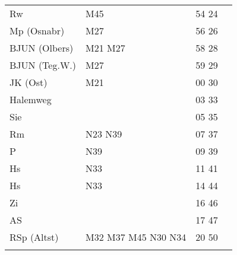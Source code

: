\begin{tabular}{!{\color{schiefergrau}\vrule width 3pt}*{4}{l!{\color{schiefergrau}\vrule width 3pt}}}
Rw           & \mbus{} M45                                 & 54 24 &             \\
Mp (Osnabr)  & \mbus{} M27                                 & 56 26 &             \\
BJUN (Olbers)& \mbus{} M21 M27                             & 58 28 &             \\
BJUN (Teg.W.)& \mbus{} M27                                 & 59 29 &             \\
JK (Ost)     & \mbus{} M21                                 & 00 30 &             \\
Halemweg     &                                             & 03 33 &             \\
Sie          &                                             & 05 35 &             \\
Rm           & \nbus{} N23 N39                             & 07 37 &             \\
P            & \nbus{} N39                                 & 09 39 &             \\
Hs           & \nbus{} N33                                 & 11 41 &             \\
\hline
Hs           & \nbus{} N33                                 & 14 44 &             \\
Zi           &                                             & 16 46 &             \\
AS           &                                             & 17 47 &             \\
RSp (Altst)  & \mbus{} M32 M37 M45 \nbus{} N30 N34         & 20 50 &             \\
\myhline
\end{tabular}
